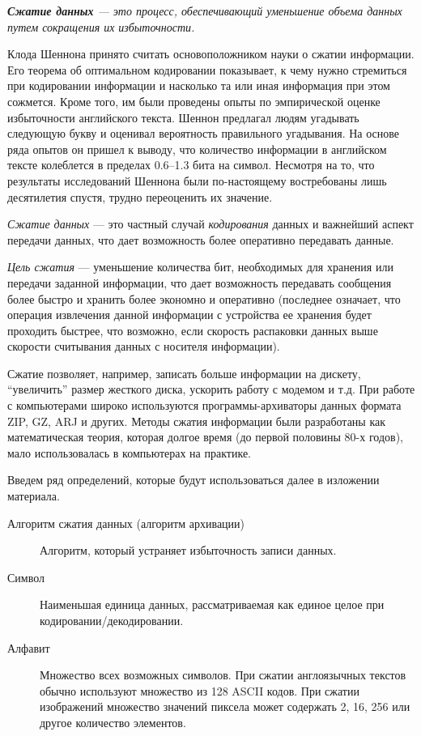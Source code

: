 \textit{\textbf{Сжатие данных} --- это процесс, обеспечивающий уменьшение объема данных путем сокращения их избыточности.}


\bigskip

Клода Шеннона принято считать основоположником науки о сжатии информации. Его теорема об оптимальном кодировании показывает, к чему нужно стремиться при кодировании информации и насколько та или иная информация при этом сожмется. Кроме того, им были проведены опыты по эмпирической оценке избыточности английского текста. Шеннон предлагал людям угадывать следующую букву и оценивал вероятность правильного угадывания. На основе ряда опытов он пришел к выводу, что количество информации в английском тексте колеблется в пределах \numrange{0.6}{1.3} бита на символ. Несмотря на то, что результаты исследований Шеннона были по-настоящему востребованы лишь десятилетия спустя, трудно переоценить их значение.

\bigskip

\emph{Сжатие данных} --- это частный случай \emph{кодирования} данных и важнейший аспект передачи данных, что дает возможность более оперативно передавать данные.

\bigskip

\emph{Цель сжатия} --- уменьшение количества бит, необходимых для хранения или передачи заданной информации, что дает возможность передавать сообщения более быстро и хранить более экономно и оперативно (последнее означает, что операция извлечения данной информации с устройства ее хранения будет проходить быстрее, что возможно, если скорость распаковки данных выше скорости считывания данных с носителя информации).

\bigskip

Сжатие позволяет, например, записать больше информации на дискету, \enquote{увеличить} размер жесткого диска, ускорить работу с модемом и т.д. При работе с компьютерами широко используются программы-архиваторы данных формата ZIP, GZ, ARJ и других. Методы сжатия информации были разработаны как математическая теория, которая долгое время (до первой половины 80-х годов), мало использовалась в компьютерах на практике.

\bigskip

\noindent
Введем ряд определений, которые будут использоваться далее в изложении материала.

\begin{description}
    \item [Алгоритм сжатия данных (алгоритм архивации)]
          Алгоритм, который устраняет избыточность записи данных.
    \item [Символ]
          Наименьшая единица данных, рассматриваемая как единое целое при кодировании/декодировании.
    \item [Алфавит]
          Множество всех возможных символов. При сжатии англоязычных текстов обычно используют множество из 128 ASCII кодов. При сжатии изображений множество значений пиксела может содержать 2, 16, 256 или другое количество элементов.
\end{description}

